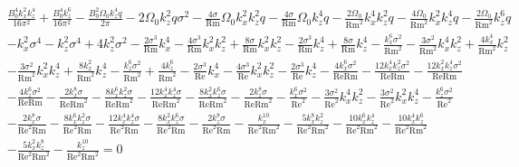 \documentclass{emulateapj}
\newcommand{\beq}{\begin{equation}}
\newcommand{\eeq}{\end{equation}}
\newcommand\reye{\mathrm{Re}}
\newcommand\reym{\mathrm{Rm}}
\begin{document}
\beq
\begin{split}
& \frac{B_{0}^{4} k_{x}^{2} k_{z}^{4}}{16 \pi^{2}} + \frac{B_{0}^{4} k_{z}^{6}}{16 \pi^{2}} - \frac{B_{0}^{2} \Omega_{0} k_{z}^{4} q}{2 \pi} - 2 \Omega_{0} k_{z}^{2} q \sigma^{2} - \frac{4 \sigma}{\reym} \Omega_{0} k_{x}^{2} k_{z}^{2} q - \frac{4 \sigma}{\reym} \Omega_{0} k_{z}^{4} q - \frac{2 \Omega_{0}}{\reym^{2}} k_{x}^{4} k_{z}^{2} q - \frac{4 \Omega_{0}}{\reym^{2}} k_{x}^{2} k_{z}^{4} q - \frac{2 \Omega_{0}}{\reym^{2}} k_{z}^{6} q \\
& - k_{x}^{2} \sigma^{4} - k_{z}^{2} \sigma^{4} + 4 k_{z}^{2} \sigma^{2} - \frac{2 \sigma^{3}}{\reym} k_{x}^{4} - \frac{4 \sigma^{3}}{\reym} k_{x}^{2} k_{z}^{2} + \frac{8 \sigma}{\reym} k_{x}^{2} k_{z}^{2} - \frac{2 \sigma^{3}}{\reym} k_{z}^{4} + \frac{8 \sigma}{\reym} k_{z}^{4} - \frac{k_{x}^{6} \sigma^{2}}{\reym^{2}} - \frac{3 \sigma^{2}}{\reym^{2}} k_{x}^{4} k_{z}^{2} + \frac{4 k_{x}^{4}}{\reym^{2}} k_{z}^{2} \\
& - \frac{3 \sigma^{2}}{\reym^{2}} k_{x}^{2} k_{z}^{4} + \frac{8 k_{x}^{2}}{\reym^{2}} k_{z}^{4} - \frac{k_{z}^{6} \sigma^{2}}{\reym^{2}} + \frac{4 k_{z}^{6}}{\reym^{2}} - \frac{2 \sigma^{3}}{\reye} k_{x}^{4} - \frac{4 \sigma^{3}}{\reye} k_{x}^{2} k_{z}^{2} - \frac{2 \sigma^{3}}{\reye} k_{z}^{4} - \frac{4 k_{x}^{6} \sigma^{2}}{\reye \reym} -  \frac{12 k_{x}^{4} k_{z}^{2} \sigma^{2}}{\reye \reym} - \frac{12 k_{x}^{2} k_{z}^{4} \sigma^{2}}{\reye \reym} \\
& - \frac{4 k_{z}^{6} \sigma^{2}}{\reye \reym} - \frac{2 k_{x}^{8} \sigma}{\reye \reym^{2}} - \frac{8 k_{x}^{6} k_{z}^{2} \sigma}{\reye \reym^{2}} - \frac{12 k_{x}^{4} k_{z}^{4} \sigma}{\reye \reym^{2}} - \frac{8 k_{x}^{2} k_{z}^{6} \sigma}{\reye \reym^{2}} - \frac{2 k_{z}^{8} \sigma}{\reye \reym^{2}} - \frac{k_{x}^{6} \sigma^{2}}{\reye^{2}} - \frac{3 \sigma^{2}}{\reye^{2}} k_{x}^{4} k_{z}^{2} - \frac{3 \sigma^{2}}{\reye^{2}} k_{x}^{2} k_{z}^{4} - \frac{k_{z}^{6} \sigma^{2}}{\reye^{2}} \\
& - \frac{2 k_{x}^{8} \sigma}{\reye^{2} \reym} - \frac{8 k_{x}^{6} k_{z}^{2} \sigma}{\reye^{2} \reym} - \frac{12 k_{x}^{4} k_{z}^{4} \sigma}{\reye^{2} \reym} - \frac{8 k_{x}^{2} k_{z}^{6} \sigma}{\reye^{2} \reym} - \frac{2 k_{z}^{8} \sigma}{\reye^{2} \reym} - \frac{k_{x}^{10}}{\reye^{2} \reym^{2}} - \frac{5 k_{x}^{8} k_{z}^{2}}{\reye^{2} \reym^{2}} - \frac{10 k_{x}^{6} k_{z}^{4}}{\reye^{2} \reym^{2}} - \frac{10 k_{x}^{4} k_{z}^{6}}{\reye^{2} \reym^{2}} \\
& - \frac{5 k_{x}^{2} k_{z}^{8}}{\reye^{2} \reym^{2}} - \frac{k_{z}^{10}}{\reye^{2} \reym^{2}} = 0
\end{split}
\eeq
\end{document}

